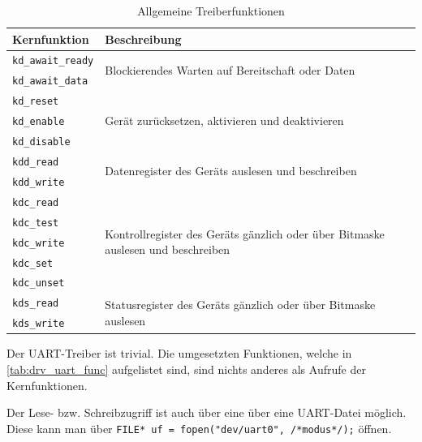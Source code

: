\begin{table}[!htbp]
	\bigskip
	\centering
	\begin{tabular}{ l | l }
		\textbf{Kernfunktion} & \textbf{Beschreibung} \\
		\hline				
		\texttt{kd\_await\_ready} & \multirow{2}{*}{\parbox{0.5\linewidth}{Blockierendes Warten auf Bereitschaft oder Daten}} \\
		\texttt{kd\_await\_data}  \\
		\hline
		\texttt{kd\_reset} & \multirow{3}{*}{\parbox{0.5\linewidth}{Gerät zurücksetzen, aktivieren und deaktivieren}} \\
		\texttt{kd\_enable}  \\
		\texttt{kd\_disable} \\
		\hline
		\texttt{kdd\_read} & \multirow{2}{*}{\parbox{0.5\linewidth}{Datenregister des Geräts auslesen und beschreiben}} \\
		\texttt{kdd\_write} \\
		\hline
		\texttt{kdc\_read} & \multirow{5}{*}{\parbox{0.5\linewidth}{Kontrollregister des Geräts gänzlich oder über Bitmaske auslesen und beschreiben}} \\
		\texttt{kdc\_test} \\
		\texttt{kdc\_write} \\
		\texttt{kdc\_set} \\
		\texttt{kdc\_unset} \\
		\hline
		\texttt{kds\_read} & \multirow{2}{*}{\parbox{0.5\linewidth}{Statusregister des Geräts gänzlich oder über Bitmaske auslesen}} \\
		\texttt{kds\_write} \\
		\hline
	\end{tabular}
	
	\caption{Allgemeine Treiberfunktionen}
	\label{tab:drv_generic_func}
\end{table}


Der UART-Treiber ist trivial. Die umgesetzten Funktionen, welche in \cref{tab:drv_uart_func}  aufgelistet sind, sind nichts anderes als Aufrufe der Kernfunktionen. 

Der Lese- bzw. Schreibzugriff ist auch über eine über eine UART-Datei möglich. Diese kann man über \texttt{FILE* uf = fopen("dev/uart0", /*modus*/);} öffnen.

